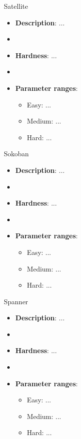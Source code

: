 \documentclass[aspectratio=169,xcolor=dvipsnames]{beamer}
\begin{document}
\begin{frame}{Satellite}

    \begin{itemize}
        \item \textbf{Description}: ...
        \item[]
        \item \textbf{Hardness}: ...
        \item[]
        \item \textbf{Parameter ranges}:
        \begin{itemize}
            \item Easy: ...
            \item Medium: ...
            \item Hard: ...
        \end{itemize}
    \end{itemize}

\end{frame}


\begin{frame}{Sokoban}

    \begin{itemize}
        \item \textbf{Description}: ...
        \item[]
        \item \textbf{Hardness}: ...
        \item[]
        \item \textbf{Parameter ranges}:
        \begin{itemize}
            \item Easy: ...
            \item Medium: ...
            \item Hard: ...
        \end{itemize}
    \end{itemize}

\end{frame}


\begin{frame}{Spanner}

    \begin{itemize}
        \item \textbf{Description}: ...
        \item[]
        \item \textbf{Hardness}: ...
        \item[]
        \item \textbf{Parameter ranges}:
        \begin{itemize}
            \item Easy: ...
            \item Medium: ...
            \item Hard: ...
        \end{itemize}
    \end{itemize}

\end{frame}
\end{document}
